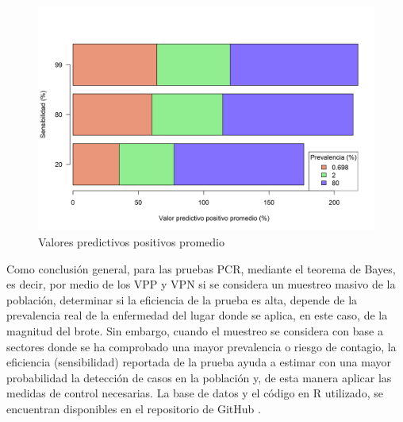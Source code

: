 \documentclass{article}
\begin{document}
\begin{figure}[h]
\centering
\includegraphics[scale=0.6]{Figures/vpp.png}
\caption{Valores predictivos positivos promedio}
\label{resultadovpp}
\end{figure}

Como conclusión general, para las pruebas PCR, mediante el teorema de Bayes, es decir, por medio de los VPP y VPN si se considera un muestreo masivo de la población, determinar si la eficiencia de la prueba es alta, depende de la prevalencia real de la enfermedad del lugar donde se aplica, en este caso, de la magnitud del brote. Sin embargo, cuando el muestreo se considera con base a sectores donde se ha comprobado una mayor prevalencia o riesgo de contagio, la eficiencia (sensibilidad) reportada de la prueba ayuda a estimar con una mayor probabilidad la detección de casos en la población y, de esta manera aplicar las medidas de control necesarias. La base de datos y el código en R utilizado, se encuentran disponibles en el repositorio de GitHub \cite{github}.



\end{document}
